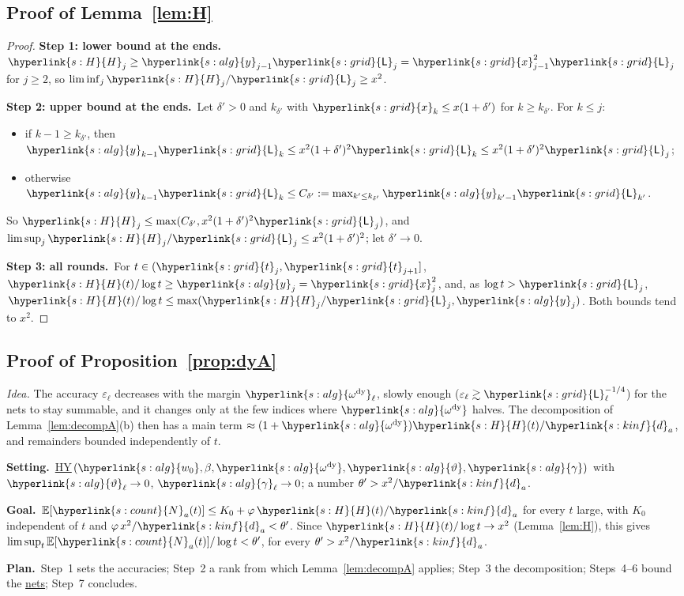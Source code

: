 \documentclass[10pt]{article}
\newcommand{\sy}[2]{{\hyperlink{#1}{#2}}}
\newcommand{\E}{\mathbb{E}}
\newcommand{\1}{\mathbf{1}}
\newcommand{\da}{\sy{s:kinf}{d}_a}
\newcommand{\Ng}{\sy{s:count}{N}}
\newcommand{\tl}{\sy{s:grid}{t}}
\newcommand{\Lg}{\sy{s:grid}{\mathsf L}}
\newcommand{\xg}{\sy{s:grid}{x}}
\newcommand{\HY}{\hyperref[def:hy]{\textup{HY}}}
\newcommand{\wz}{\sy{s:alg}{w_0}}
\newcommand{\yg}{\sy{s:alg}{y}}
\newcommand{\ody}{\sy{s:alg}{\omega^{\mathrm{dy}}}}
\newcommand{\thv}{\sy{s:alg}{\vartheta}}
\newcommand{\gam}{\sy{s:alg}{\gamma}}
\newcommand{\HH}{\sy{s:H}{H}}
\newcommand{\Setting}{\noindent\textbf{Setting.}\ }
\newcommand{\Goal}{\par\smallskip\noindent\textbf{Goal.}\ }
\newcommand{\Plan}{\par\smallskip\noindent\textbf{Plan.}\ }
\newcommand{\stp}[2]{\par\medskip\noindent\textbf{Step #1: #2.}\ }
\newcommand{\term}[2]{\hyperlink{#1}{#2}}
\begin{document}
\subsection{Proof of Lemma~\ref{lem:H}}\label{sec:pf-lem:H}
\begin{proof}
\stp1{lower bound at the ends}$\HH_j\ge\yg_{j-1}\Lg_j=\xg_{j-1}^2\Lg_j$ for $j\ge2$, so $\liminf_j\HH_j/\Lg_j\ge x^2$.

\stp2{upper bound at the ends}Let $\delta'>0$ and $k_{\delta'}$ with $\xg_k\le x(1+\delta')$ for $k\ge k_{\delta'}$. For $k\le j$:
\begin{itemize}
\item if $k-1\ge k_{\delta'}$, then $\yg_{k-1}\Lg_k\le x^2(1+\delta')^2\Lg_k\le x^2(1+\delta')^2\Lg_j$;
\item otherwise $\yg_{k-1}\Lg_k\le C_{\delta'}:=\max_{k'\le k_{\delta'}}\yg_{k'-1}\Lg_{k'}$.
\end{itemize}
So $\HH_j\le\max(C_{\delta'},x^2(1+\delta')^2\Lg_j)$, and $\limsup_j\HH_j/\Lg_j\le x^2(1+\delta')^2$; let $\delta'\to0$.

\stp3{all rounds}For $t\in(\tl_j,\tl_{j+1}]$, $\HH(t)/\log t\ge\yg_j=\xg_j^2$, and, as $\log t>\Lg_j$, $\HH(t)/\log t\le\max(\HH_j/\Lg_j,\yg_j)$. Both bounds tend to $x^2$.
\end{proof}

\subsection{Proof of Proposition~\ref{prop:dyA}}\label{sec:pf-prop:dyA}
\noindent\emph{Idea.} The accuracy $\varepsilon_\ell$ decreases with the margin $\ody_\ell$, slowly enough ($\varepsilon_\ell\gtrsim\Lg_\ell^{-1/4}$) for the nets to stay summable,
and it changes only at the few indices where $\ody$ halves. The decomposition of Lemma~\ref{lem:decompA}(b) then has a main term $\approx(1+\ody)\HH(t)/\da$, and remainders
bounded independently of $t$.

\begin{setgoal}
\Setting \HY$(\wz,\beta,\ody,\thv,\gam)$ with $\thv_\ell\to0$, $\gam_\ell\to0$; a number $\theta'>x^2/\da$.
\Goal $\E[\Ng_a(t)]\le K_0+\varphi\,\HH(t)/\da$ for every $t$ large, with $K_0$ independent of $t$ and $\varphi\,x^2/\da<\theta'$. Since $\HH(t)/\log t\to x^2$
(Lemma~\ref{lem:H}), this gives $\limsup_t\E[\Ng_a(t)]/\log t<\theta'$, for every $\theta'>x^2/\da$.
\Plan Step~1 sets the accuracies; Step~2 a rank from which Lemma~\ref{lem:decompA} applies; Step~3 the decomposition; Steps~4--6 bound the \term{t:net}{nets}; Step~7 concludes.
\end{setgoal}
\end{document}

